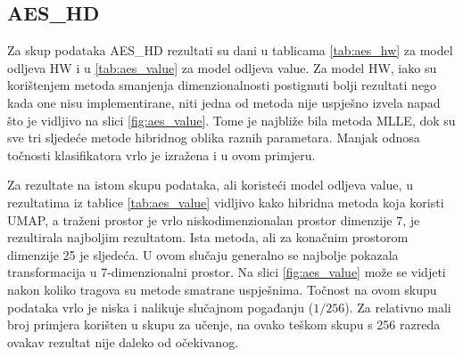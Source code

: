 \documentclass[times, utf8, diplomski]{fer}
\begin{document}
\subsection{AES\_HD}
Za skup podataka AES\_HD rezultati su dani u tablicama \ref{tab:aes_hw} za model odljeva HW i u \ref{tab:aes_value} za model odljeva value. Za model HW, iako su korištenjem metoda smanjenja dimenzionalnosti postignuti bolji rezultati nego kada one nisu implementirane, niti jedna od metoda nije uspješno izvela napad što je vidljivo na slici \ref{fig:aes_value}. Tome je najbliže bila metoda MLLE, dok su sve tri sljedeće metode hibridnog oblika raznih parametara. Manjak odnosa točnosti klasifikatora vrlo je izražena i u ovom primjeru.

Za rezultate na istom skupu podataka, ali koristeći model odljeva value, u rezultatima iz tablice \ref{tab:aes_value} vidljivo kako hibridna metoda koja koristi UMAP, a traženi prostor je vrlo niskodimenzionalan prostor dimenzije 7, je rezultirala najboljim rezultatom. Ista metoda, ali za konačnim prostorom dimenzije 25 je sljedeća. U ovom slučaju generalno se najbolje pokazala transformacija u 7-dimenzionalni prostor. Na slici \ref{fig:aes_value} može se vidjeti nakon koliko tragova su metode smatrane uspješnima. Točnost na ovom skupu podataka vrlo je niska i nalikuje slučajnom pogađanju ($1 / 256$). Za relativno mali broj primjera korišten u skupu za učenje, na ovako teškom skupu s 256 razreda ovakav rezultat nije daleko od očekivanog.
\end{document}
